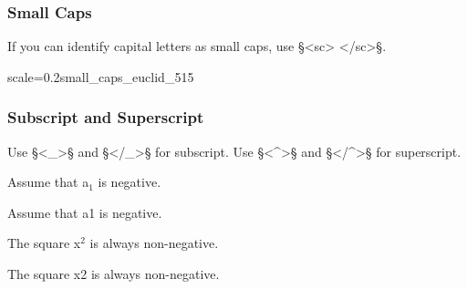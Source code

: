 \subsubsection{Small Caps}
\label{section small caps}

\begin{mainrule}
If you can identify capital letters as small caps, use §<sc> </sc>§. 
\end{mainrule}

\vspace{3mm}
\begin{sampleImageSmall}{scale=0.2}{small_caps_euclid_515}


\end{sampleImageSmall}


\subsubsection{Subscript and Superscript}
\label{section subscript and superscript}

\begin{mainrule}
Use §<_>§ and §</_>§ for subscript. Use §<^>§ and §</^>§ for superscript.
\end{mainrule}

\begin{example}[ 1: \, subscript]

\vspace{-4mm}
Assume that a$_1$ is negative.
\begin{typeLatin}
Assume that a\bold{<_>}1\bold{</_>} is negative.
\end{typeLatin}
\end{example}

\begin{example}[ 2: \, superscript]

\vspace{-4mm}
The square x$^2$ is always non-negative.
\begin{typeLatin}
The square x\bold{<^>}2\bold{</^>} is always non-negative.
\end{typeLatin}
\end{example}

